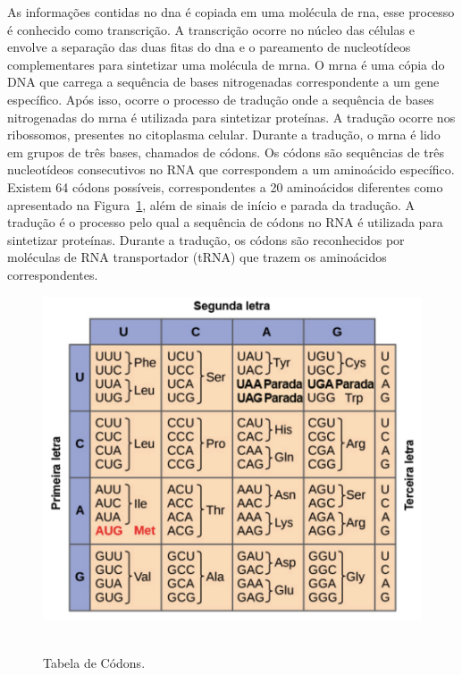 As informações contidas no \gls{dna} é copiada em uma molécula de \gls{rna}, esse processo é conhecido como transcrição. A transcrição ocorre no núcleo das células e envolve a separação das duas fitas do \gls{dna} e o pareamento de nucleotídeos complementares para sintetizar uma molécula de \gls{mrna}. O \gls{mrna} é uma cópia do DNA que carrega a sequência de bases nitrogenadas correspondente a um gene específico.
Após isso, ocorre o processo de tradução onde a sequência de bases nitrogenadas do \gls{mrna} é utilizada para sintetizar proteínas. A tradução ocorre nos ribossomos, presentes no citoplasma celular. Durante a tradução, o \gls{mrna} é lido em grupos de três bases, chamados de códons. Os códons são sequências de três nucleotídeos consecutivos no RNA que correspondem a um aminoácido específico. Existem 64 códons possíveis, correspondentes a 20 aminoácidos diferentes como apresentado na Figura~\ref{fig:tabelaCodons}, além de sinais de início e parada da tradução. A tradução é o processo pelo qual a sequência de códons no RNA é utilizada para sintetizar proteínas. Durante a tradução, os códons são reconhecidos por moléculas de RNA transportador (tRNA) que trazem os aminoácidos correspondentes.
\begin{figure}[htb]
  \centering
  \caption{Tabela de Códons.}
  \includegraphics[scale=0.6]{figuras/tabelaCodons.pdf}
  ~\label{fig:tabelaCodons}
\end{figure}



